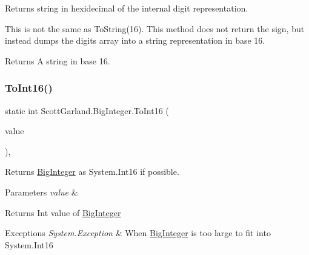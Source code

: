 Returns string in hexidecimal of the internal digit representation. 

This is not the same as To\+String(16). This method does not return the sign, but instead dumps the digits array into a string representation in base 16. 

\begin{DoxyReturn}{Returns}
A string in base 16.
\end{DoxyReturn}
\mbox{\label{class_scott_garland_1_1_big_integer_a282c756614e3530c7ca3db75122df382}} 
\subsubsection{\texorpdfstring{To\+Int16()}{ToInt16()}}
{\footnotesize\ttfamily static int Scott\+Garland.\+Big\+Integer.\+To\+Int16 (\begin{DoxyParamCaption}\item[{\hyperlink{class_scott_garland_1_1_big_integer}{Big\+Integer}}]{value }\end{DoxyParamCaption})\hspace{0.3cm}{\ttfamily [inline]}, {\ttfamily [static]}}



Returns \hyperlink{class_scott_garland_1_1_big_integer}{Big\+Integer} as System.\+Int16 if possible. 


\begin{DoxyParams}{Parameters}
{\em value} & \\
\hline
\end{DoxyParams}
\begin{DoxyReturn}{Returns}
Int value of \hyperlink{class_scott_garland_1_1_big_integer}{Big\+Integer}
\end{DoxyReturn}

\begin{DoxyExceptions}{Exceptions}
{\em System.\+Exception} & When \hyperlink{class_scott_garland_1_1_big_integer}{Big\+Integer} is too large to fit into System.\+Int16\\
\hline
\end{DoxyExceptions}
\mbox{\label{class_scott_garland_1_1_big_integer_ae3db4ced22f3c869e6093fe0dc3f7b73}} 
